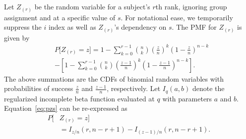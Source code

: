 \documentclass[12pt]{article}
\theoremstyle{plain}
\begin{document}
Let $Z_{(r)}$ be the random variable for a subject's $r$th rank, ignoring group assignment and at a specific value of $s$. For notational ease, we temporarily suppress the $i$ index as well as $Z_{(r)}$'s dependency on $s$. The PMF for $Z_{(r)}$ is given by
\begin{align}
	&P\bigg[ Z_{(r)} = z \bigg] = 
	1 - \sum_{k = 0}^{r-1} {n \choose k} \left(\frac{z}{n}\right)^k\left(1-\frac{z}{n}\right)^{n-k} \label{eq:pzs}\\
	&-  \left[1 - \sum_{k = 0}^{r-1} {n \choose k} \left(\frac{z - 1}{n}\right)^k\left(1-\frac{z - 1}{n}\right)^{n-k} \right]. \nonumber
\end{align}
	The above summations are the CDFs of binomial random variables with probabilities of success $\frac{z}{n}$ and $\frac{z-1}{n}$, respectively. Let $I_q(a,b)$ denote the regularized incomplete beta function evaluated at $q$ with parameters $a$ and $b$. Equation~\eqref{eq:pzs} can be re-expressed as
\begin{align}
	P\bigg[ &Z_{(r)} = z \bigg] \label{eq:pzr} \\
	&= I_{z/n}(r, n - r + 1) -  I_{(z-1)/n}(r, n - r + 1).\nonumber 
\end{align}
\end{document}
